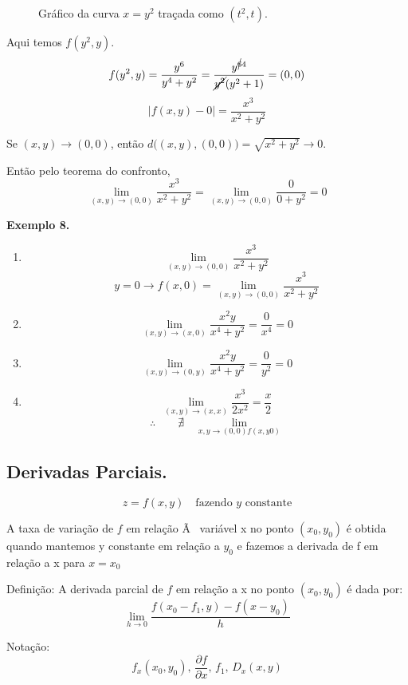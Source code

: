 \begin{figure}[H]
\centering
{}
\caption{Gráfico da curva $x = y^2$ traçada como $(t^2,t)$.}
\label{fig:xy2}
\end{figure}
Aqui temos $f(y^2,y)$.
\[f(y^2,y)=\frac{y^6}{y^4+y^2}=\frac{y^{\cancel{6}4}}{\cancel{y^2}(y^2+1)}=(0,0)\]
\[|f(x,y)-0|=\frac{x^3}{x^2+y^2}\]

Se $(x,y)\to(0,0)$, então $d\big((x,y),(0,0)\big)=\sqrt{x^2+y^2}\to 0$.

Então pelo teorema do confronto,
\[\lim_{(x,y)\to(0,0)}\frac{x^3}{x^2+y^2}=\lim_{(x,y)\to(0,0)}\frac{0}{0+y^2}=0\]

\textbf{Exemplo 8.}
\begin{enumerate}
  \item \[\lim_{(x,y)\to(0,0)}\frac{x^3}{x^2+y^2}\]
\[y=0\to f(x,0)=\lim_{(x,y)\to(0,0)}\frac{x^3}{x^2+y^2}\]
  \item \[\lim_{(x,y)\to(x,0)}\frac{x^2y}{x^4+y^2}=\frac{0}{x^4}=0\]
  \item \[\lim_{(x,y)\to(0,y)}\frac{x^2y}{x^4+y^2}=\frac{0}{y^2}=0\]
  \item \[\lim_{(x,y)\to(x,x)}\frac{x^3}{2x^2}=\frac{x}{2}\]
\[ \therefore\qquad\nexists\quad\lim_{x,y\to(0,0)f(x,y0)} \]
\end{enumerate}
\newpage
\subsection{Derivadas Parciais.}
\[ z = f(x,y) \quad \text{fazendo $y$ constante} \]

A taxa de variação de $f$ em relação Ã  variável x no ponto $(x_0,y_0)$ é 
obtida quando mantemos y constante em relação a $y_0$ e fazemos a 
derivada de f em relação a x para $x=x_0$

Definição: A derivada parcial de $f$ em relação a x no ponto 
$(x_0,y_0)$ é dada por:
\[ \lim_{h\to0}\frac{f(x_0-f_1, y)-f(x-y_0)}{h}\]

Notação:
\[ f_x(x_0,y_0),\, \frac{\partial f}{\partial x},\, f_1,\, D_x(x,y) \]

